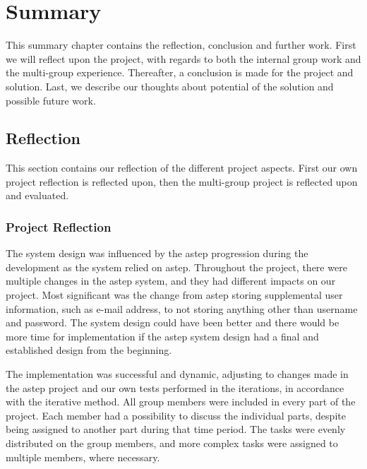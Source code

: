 \chapter{Summary}
This summary chapter contains the reflection, conclusion and further work.
First we will reflect upon the project, with regards to both the internal group work and the multi-group experience.
Thereafter, a conclusion is made for the project and solution.
Last, we describe our thoughts about potential of the solution and possible future work.

\section{Reflection}
This section contains our reflection of the different project aspects.
First our own project reflection is reflected upon, then the multi-group project is reflected upon and evaluated.

\subsection{Project Reflection}
The system design was influenced by the \gls{astep} progression during the development as the system relied on \gls{astep}.
Throughout the project, there were multiple changes in the \gls{astep} system, and they had different impacts on our project.
Most significant was the change from \gls{astep} storing supplemental user information, such as e-mail address, to not storing anything other than username and password.
The system design could have been better and there would be more time for implementation if the \gls{astep} system design had a final and established design from the beginning.

The implementation was successful and dynamic, adjusting to changes made in the \gls{astep} project and our own tests performed in the iterations, in accordance with the iterative method.
All group members were included in every part of the project.
Each member had a possibility to discuss the individual parts, despite being assigned to another part during that time period.
The tasks were evenly distributed on the group members, and more complex tasks were assigned to multiple members, where necessary.


